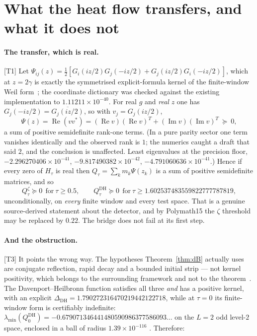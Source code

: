 \documentclass[11pt,a4paper]{article}
\theoremstyle{remark}
\newcommand{\tier}[1]{{\small\textsf{[#1]}}}
\begin{document}
\section{What the heat flow transfers, and what it does not}\label{sec:transfer}

\paragraph{The transfer, which is real.} \tier{T1} Let $\Psi_{ij}(z)=
\tfrac12[G_i(iz/2)G_j(-iz/2)+G_j(iz/2)G_i(-iz/2)]$, which at $z=2\gamma$ is exactly the
symmetrised explicit-formula kernel of the finite-window Weil form~\cite{deltaL3}; the
coordinate dictionary was checked against the existing implementation to
$1.11211\times10^{-40}$. For real $g$ and \emph{real} $z$ one has
$G_j(-iz/2)=\overline{G_j(iz/2)}$, so with $v_j=G_j(iz/2)$,
\[
  \Psi(z)=\operatorname{Re}(vv^*)=(\operatorname{Re}v)(\operatorname{Re}v)^T
  +(\operatorname{Im}v)(\operatorname{Im}v)^T\ \succeq\ 0 ,
\]
a sum of positive semidefinite rank-one terms. (In a pure parity sector one term vanishes
identically and the observed rank is $1$; the numerics caught a draft that said $2$, and the
conclusion is unaffected. Least eigenvalues at the precision floor,
$-2.296270406\times10^{-41}$, $-9.817490382\times10^{-42}$,
$-4.791060636\times10^{-41}$.) Hence if every zero of $H_\tau$ is real then
$Q_\tau=\sum_k m_k\Psi(z_k)$ is a sum of positive semidefinite matrices, and so
\[
  Q^\zeta_\tau\succeq0\ \ \text{for}\ \tau\ge0.5,\qquad
  Q^{\mathrm{DH}}_\tau\succeq0\ \ \text{for}\ \tau\ge1.602537483559822777787819,
\]
unconditionally, on \emph{every} finite window and every test space. That is a genuine
source-derived statement about the detector, and by Polymath15 the $\zeta$ threshold may be
replaced by $0.22$. The bridge does not fail at its first step.

\paragraph{And the obstruction.} \tier{T3} It points the wrong way. The hypotheses
Theorem~\ref{thm:dB} actually uses are conjugate reflection, rapid decay and a bounded
initial strip --- not kernel positivity, which belongs to the surrounding framework
and not to the theorem~\cite[\S S3]{audit}. The Davenport--Heilbronn function satisfies all
three \emph{and} has a positive kernel, with an explicit
$\Delta_{\mathrm{DH}}=1.790272316470219442122718$, while at $\tau=0$ its finite-window form
is certifiably indefinite: $\lambda_{\min}(Q^{\mathrm{DH}}_0)=
-0.679071346441480590986377586093\ldots$ on the $L=2$ odd level-$2$ space, enclosed in a
ball of radius $1.39\times10^{-116}$ \cite{dhnote}. Therefore:
\end{document}
